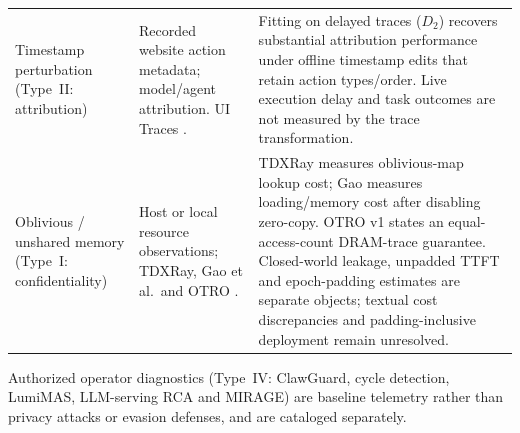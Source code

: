 \begin{table}[t]
\begin{tabularx}{\textwidth}{@{}p{}p{}Y@{}}
Timestamp perturbation (Type~II: attribution) & Recorded website action metadata; model/agent attribution. UI Traces \cite{uitraces2026}. & Fitting on delayed traces ($D_2$) recovers substantial attribution performance under offline timestamp edits that retain action types/order. Live execution delay and task outcomes are not measured by the trace transformation.\\
Oblivious / unshared memory (Type~I: confidentiality) & Host or local resource observations; TDXRay, Gao et al.\ and OTRO \cite{hornetz2026tdxray,gao2025iknow,lee2026otro}. & TDXRay measures oblivious-map lookup cost; Gao measures loading/memory cost after disabling zero-copy. OTRO v1 states an equal-access-count DRAM-trace guarantee. Closed-world leakage, unpadded TTFT and epoch-padding estimates are separate objects; textual cost discrepancies and padding-inclusive deployment remain unresolved.\\\bottomrule
\end{tabularx}
\par\smallskip\raggedright\footnotesize
Authorized operator diagnostics (Type~IV: ClawGuard, cycle detection, LumiMAS, LLM-serving RCA and MIRAGE) are baseline telemetry rather than privacy attacks or evasion defenses, and are cataloged separately.
\end{table}
